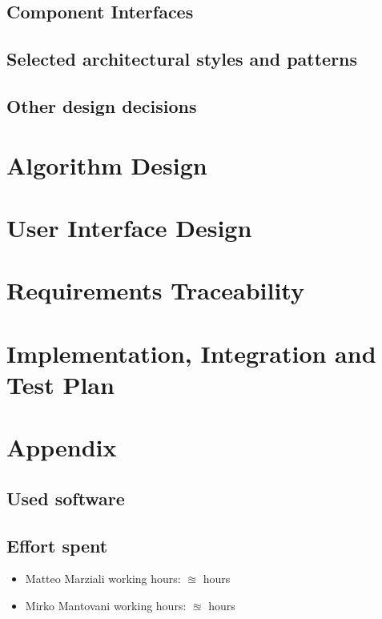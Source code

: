 \documentclass{article}
\begin{document}
\subsection{Component Interfaces}\label{componentinterfaces}

\subsection{Selected architectural styles and patterns}\label{archstyles}

\subsection{Other design decisions}\label{otherdecisions}

\clearpage
\section{Algorithm Design}

\clearpage
\section{User Interface Design}


\clearpage
\section{Requirements Traceability}

\clearpage
\section{Implementation, Integration and Test Plan}



\clearpage
\section{Appendix}

\subsection{Used software}


\subsection{Effort spent}
\begin{itemize}

\item Matteo Marziali working hours:  $\approxeq$ hours

\item Mirko Mantovani working hours:  $\approxeq$ hours



\end{itemize}
\end{document}

